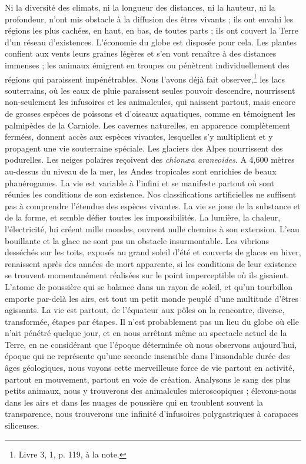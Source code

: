 \documentclass[a4paper, 11pt, oneside, landscape]{article}
\begin{document}
Ni la diversité des climats, ni la longueur des distances, ni la hauteur, ni la profondeur, n'ont mis obstacle à la diffusion des êtres vivants ; ils ont envahi les régions les plus cachées, en haut, en bas, de toutes parts ; ils ont couvert la Terre d'un réseau d'existences. L'économie du globe est disposée pour cela. Les plantes confient aux vents leurs graines légères et s'en vont renaître à des distances immenses ; les animaux émigrent en troupes ou pénètrent individuellement des régions qui paraissent impénétrables. Nous l'avons déjà fait observer,\footnote{Livre 3, 1, p. 119, à la note.} les lacs souterrains, où les eaux de pluie paraissent seules pouvoir descendre, nourrissent non-seulement les infusoires et les animalcules, qui naissent partout, mais encore de grosses espèces de poissons et d'oiseaux aquatiques, comme en témoignent les palmipèdes de la Carniole. Les cavernes naturelles, en apparence complètement fermées, donnent accès aux espèces vivantes, lesquelles s'y multiplient et y propagent une vie souterraine spéciale. Les glaciers des Alpes nourrissent des podurelles. Les neiges polaires reçoivent des \emph{chionæa araneoides}. A 4,600 mètres au-dessus du niveau de la mer, les Andes tropicales sont enrichies de beaux phanérogames. La vie est variable à l'infini et se manifeste partout où sont réunies les conditions de son existence. Nos classifications artificielles ne suffisent pas à comprendre l'étendue des espèces vivantes. La vie se joue de la substance et de la forme, et semble défier toutes les impossibilités. La lumière, la chaleur, l'électricité, lui créent mille mondes, ouvrent nulle chemins à son extension. L'eau bouillante et la glace ne sont pas un obstacle insurmontable. Les vibrions desséchés sur les toits, exposés au grand soleil d'été et couverts de glaces en hiver, renaissent après des années de mort apparente, si les conditions de leur existence se trouvent momentanément réalisées sur le point imperceptible où ils gisaient. L'atome de poussière qui se balance dans un rayon de soleil, et qu'un tourbillon emporte par-delà les airs, est tout un petit monde peuplé d'une multitude d'êtres agissants. La vie est partout, de l'équateur aux pôles on la rencontre, diverse, transformée, étapes par étapes. Il n'est probablement pas un lieu du globe où elle n'ait pénétré quelque jour, et en nous arrêtant même au spectacle actuel de la Terre, en ne considérant que l'époque déterminée où nous observons aujourd'hui, époque qui ne représente qu'une seconde insensible dans l'insondable durée des âges géologiques, nous voyons cette merveilleuse force de vie partout en activité, partout en mouvement, partout en voie de création. Analysons le sang des plus petits animaux, nous y trouverons des animalcules microscopiques ; élevons-nous dans les airs et dans les nuages de poussière qui en troublent souvent la transparence, nous trouverons une infinité d'infusoires polygastriques à carapaces siliceuses.
\end{document}
